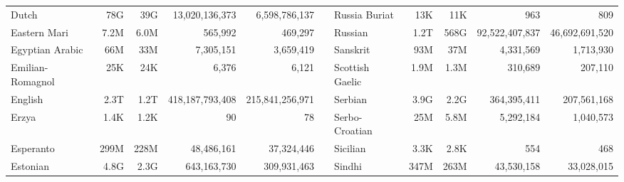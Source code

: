 \begin{table*}[t!]
\begin{tabular}{lrrrrclrrrr}
        Dutch                     & 78G                      & 39G                       & 13,020,136,373           & 6,598,786,137             &                          & Russia Buriat             & 13K                      & 11K                       & 963                      & 809                       \\
        Eastern Mari              & 7.2M                     & 6.0M                      & 565,992                  & 469,297                   &                          & Russian                   & 1.2T                     & 568G                      & 92,522,407,837           & 46,692,691,520            \\
        Egyptian Arabic           & 66M                      & 33M                       & 7,305,151                & 3,659,419                 &                          & Sanskrit                  & 93M                      & 37M                       & 4,331,569                & 1,713,930                 \\
        Emilian-Romagnol          & 25K                      & 24K                       & 6,376                    & 6,121                     &                          & Scottish Gaelic           & 1.9M                     & 1.3M                      & 310,689                  & 207,110                   \\
        English                   & 2.3T                     & 1.2T                      & 418,187,793,408          & 215,841,256,971           &                          & Serbian                   & 3.9G                     & 2.2G                      & 364,395,411              & 207,561,168               \\
        Erzya                     & 1.4K                     & 1.2K                      & 90                       & 78                        &                          & Serbo-Croatian            & 25M                      & 5.8M                      & 5,292,184                & 1,040,573                 \\
        Esperanto                 & 299M                     & 228M                      & 48,486,161               & 37,324,446                &                          & Sicilian                  & 3.3K                     & 2.8K                      & 554                      & 468                       \\
        Estonian                  & 4.8G                     & 2.3G                      & 643,163,730              & 309,931,463               &                          & Sindhi                    & 347M                     & 263M                      & 43,530,158               & 33,028,015                \\

\end{tabular}
\end{table*}
